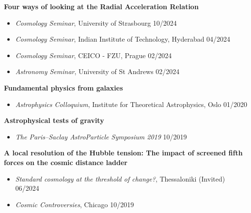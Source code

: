 \documentclass[11pt]{article}
\newenvironment{outerlist}[1][\enskip\textbullet]%
        {\begin{itemize}[#1]}{\end{itemize}%
         \vspace{-.6\baselineskip}}
\newcommand{\blankline}{\quad\pagebreak[2]}
\begin{document}
\blankline

\textbf{Four ways of looking at the Radial Acceleration Relation}
\vspace{-0.35\baselineskip}
\begin{outerlist}
\item[] \textit{Cosmology Seminar}, University of Strasbourg \hfill 10/2024 \\
\vspace{-1.4\baselineskip}
\item[] \textit{Cosmology Seminar}, Indian Institute of Technology, Hyderabad \hfill 04/2024 \\
\vspace{-1.4\baselineskip}
\item[] \textit{Cosmology Seminar}, CEICO - FZU, Prague \hfill 02/2024 \\
\vspace{-1.4\baselineskip}
\item[] \textit{Astronomy Seminar}, University of St Andrews \hfill 02/2024 \\
\vspace{-1.\baselineskip}
\end{outerlist}

\blankline

\textbf{Fundamental physics from galaxies}
\vspace{-0.35\baselineskip}
\begin{outerlist}
\item[] \textit{Astrophysics Colloquium}, Institute for Theoretical Astrophysics, Oslo \hfill 01/2020 \\
\vspace{-1.\baselineskip}
\end{outerlist}

\blankline

\textbf{Astrophysical tests of gravity}
\vspace{-0.35\baselineskip}
\begin{outerlist}
\item[] \textit{The Paris--Saclay AstroParticle Symposium 2019} \hfill 10/2019 \\
\vspace{-1.\baselineskip}
\end{outerlist}

\blankline

\textbf{A local resolution of the Hubble tension: The impact of screened fifth forces on the cosmic distance ladder}
\vspace{-0.35\baselineskip}
\begin{outerlist}
\item[] \textit{Standard cosmology at the threshold of change?}, Thessaloniki (Invited) \hfill 06/2024 \\
\vspace{-1.4\baselineskip}
\item[] \textit{Cosmic Controversies}, Chicago \hfill 10/2019 \\
\vspace{-1.\baselineskip}
\end{outerlist}
\end{document}

